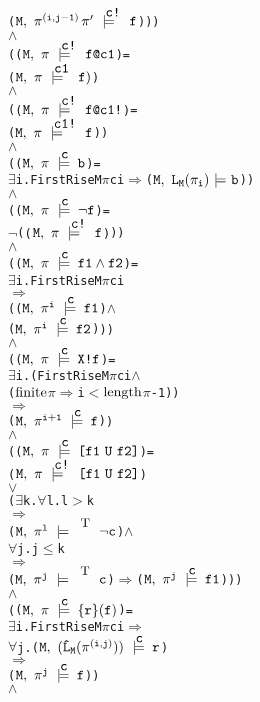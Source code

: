 \documentclass{llncs}
\makeatletter
\newcommand{\And}{\(\wedge\)}
\newcommand{\Or}{\(\vee\)}
\newcommand{\Imp}{\(\Rightarrow\)}
\newcommand{\Not}{\(\neg\)}
\newcommand{\Forall}{\(\forall\)}
\newcommand{\Exists}{\(\exists\)}
\newcommand{\IsFinitePath}{\({\rm{finite}}\)}
\newcommand{\PathLength}{\({\rm{length}}\)}
\newcommand{\pathCat}[2]{#1\hspace*{0.5mm}#2}
\newcommand{\Leq}{\(\leq\)}
\newcommand{\Le}{\(<\)}
\newcommand{\Ge}{\(>\)}
\newcommand{\T}{\texttt{\small\rm{T}}}
\renewcommand{\Pi}{\(\pi\)}
\newcommand{\BSem}[3]{(\(\tt#1,~#2~{\models}~#3\))}
\newcommand{\SSem}[4]{(\(\tt{#1,~#2~\models^{\hspace*{-2.3mm}\raisebox{1mm}{\tt#3}}~#4}\))}
\newcommand{\FSem}[4]{(\(\tt{#1,~#2~\models^{\hspace*{-2.3mm}\raisebox{1mm}{\tt#3}}~#4}\))}
\newcommand{\FBool}[1]{#1}
\newcommand{\bNot}[1]{\neg#1}
\newcommand{\fNot}[1]{\neg#1}
\newcommand{\weakClock}[1]{#1}
\newcommand{\strongClock}[1]{#1!}
\newcommand{\restN}[2]{#1^{#2}}
\newcommand{\pathEl}[2]{#1_{#2}}
\newcommand{\pathSeg}[2]{#1^{#2}}
\newcommand{\lHat}[1]{\hat{\texttt{L}}_{#1}}
\newcommand{\lNoHat}[1]{{\texttt{L}}_{#1}}
\newcommand{\fAnd}[2]{#1 \wedge #2}
\newcommand{\fNext}[1]{\texttt{X!}#1}
\newcommand{\fUntil}[2]{\texttt{[}#1~\texttt{U}~#2\texttt{]}}
\newcommand{\fSuffixImp}[2]{\{#1\}(#2)}
\newcommand{\fWeakClock}[2]{#1\texttt{@}#2}
\newcommand{\fStrongClock}[2]{#1\texttt{@}#2\texttt{!}}
\makeatother
\begin{document}
{\begin{alltt}
             {\FSem{M}{\pathCat{\pathSeg{\pi}{(i,j-1)}}{{\pi}'}}{{\strongClock{c}}}{f}}))
    {\And}
    ({\FSem{M}{{\pi}}{{\strongClock{c}}}{\fWeakClock{f}{c1}}} =   
      {\FSem{M}{{\pi}}{{\weakClock{c1}}}{f)}}
    {\And}
    ({\FSem{M}{{\pi}}{{\strongClock{c}}}{\fStrongClock{f}{c1}}} =   
      {\FSem{M}{{\pi}}{{\strongClock{c1}}}{f}})
    {\And}
    ({\FSem{M}{{\pi}}{{\weakClock{c}}}{{\FBool{b}}}} = 
      {\Exists}i. FirstRise M {\Pi} c i {\Imp} {\BSem{M}{\lNoHat{M}(\pathEl{{\pi}}{i})}{b}})
    {\And}
    ({\FSem{M}{{\pi}}{{\weakClock{c}}}{\fNot{f}}} = 
      {\Not}({\FSem{M}{{\pi}}{{\strongClock{c}}}{f}})) 
    {\And}
    ({\FSem{M}{{\pi}}{{\weakClock{c}}}{\fAnd{f1}{f2}}} = 
      {\Exists}i. FirstRise M {\Pi} c i
          {\Imp}
          ({\FSem{M}{\restN{{\pi}}{i}}{{\weakClock{c}}}{f1}} {\And}
           {\FSem{M}{\restN{{\pi}}{i}}{{\weakClock{c}}}{f2}}))
    {\And}
    ({\FSem{M}{{\pi}}{{\weakClock{c}}}{\fNext{f}}} = 
      {\Exists}i. (FirstRise M {\Pi} c i {\And}
           ({\IsFinitePath} {\Pi} {\Imp} i {\Le} \PathLength {\Pi} - 1))
          {\Imp}
          {\FSem{M}{\restN{{\pi}}{i+1}}{{\weakClock{c}}}{f}})
    {\And}
    ({\FSem{M}{{\pi}}{{\weakClock{c}}}{\fUntil{f1}{f2}}} = 
      {\FSem{M}{{\pi}}{{\strongClock{c}}}{\fUntil{f1}{f2}}}  
      {\Or}
      ({\Exists}k. {\Forall}l. l {\Ge} k
               {\Imp}
               {\FSem{M}{\restN{{\pi}}{l}}{\weakClock{\T}}{{\FBool{\bNot{c}}}}}   {\And} 
               {\Forall}j. j {\Leq} k 
                   {\Imp}
                   {\FSem{M}{\restN{{\pi}}{j}}{\weakClock{\T}}{{\FBool{c}}}} {\Imp} {\FSem{M}{\restN{{\pi}}{j}}{{\weakClock{c}}}{f1}}))
    {\And}
    ({\FSem{M}{{\pi}}{{\weakClock{c}}}{\fSuffixImp{r}{f}}} = 
      {\Exists}i. FirstRise M {\Pi} c i {\Imp}
          {\Forall}j. \SSem{M}{(\lHat{M} (\pathSeg{\pi}{(i,j)}))}{c}{r}
              {\Imp}
              {\FSem{M}{\restN{{\pi}}{j}}{{\weakClock{c}}}{f}})
    {\And}


\end{alltt}}
\end{document}
